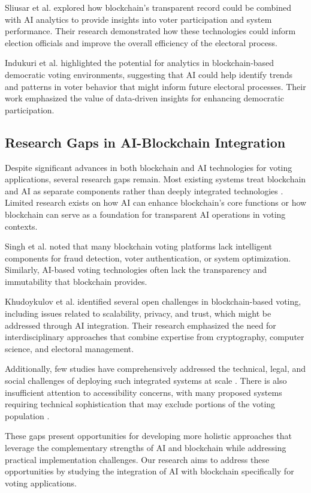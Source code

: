 \documentclass[conference]{IEEEtran}
\begin{document}
Sliusar et al. \cite{b4} explored how blockchain's transparent record could be combined with AI analytics to provide insights into voter participation and system performance. Their research demonstrated how these technologies could inform election officials and improve the overall efficiency of the electoral process.

Indukuri et al. \cite{b8} highlighted the potential for analytics in blockchain-based democratic voting environments, suggesting that AI could help identify trends and patterns in voter behavior that might inform future electoral processes. Their work emphasized the value of data-driven insights for enhancing democratic participation.

\subsection{Research Gaps in AI-Blockchain Integration}
Despite significant advances in both blockchain and AI technologies for voting applications, several research gaps remain. Most existing systems treat blockchain and AI as separate components rather than deeply integrated technologies \cite{b4}. Limited research exists on how AI can enhance blockchain's core functions or how blockchain can serve as a foundation for transparent AI operations in voting contexts.

Singh et al. \cite{b5} noted that many blockchain voting platforms lack intelligent components for fraud detection, voter authentication, or system optimization. Similarly, AI-based voting technologies often lack the transparency and immutability that blockchain provides.

Khudoykulov et al. \cite{b1} identified several open challenges in blockchain-based voting, including issues related to scalability, privacy, and trust, which might be addressed through AI integration. Their research emphasized the need for interdisciplinary approaches that combine expertise from cryptography, computer science, and electoral management.

Additionally, few studies have comprehensively addressed the technical, legal, and social challenges of deploying such integrated systems at scale \cite{b7}. There is also insufficient attention to accessibility concerns, with many proposed systems requiring technical sophistication that may exclude portions of the voting population \cite{b6}.

These gaps present opportunities for developing more holistic approaches that leverage the complementary strengths of AI and blockchain while addressing practical implementation challenges. Our research aims to address these opportunities by studying the integration of AI with blockchain specifically for voting applications.
\end{document}
